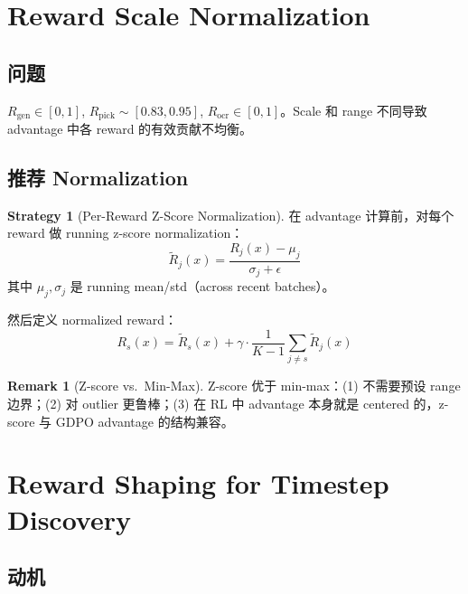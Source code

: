 \documentclass[11pt,a4paper]{article}
\newcommand{\reward}{R}
\theoremstyle{definition}
\newtheorem{remark}{Remark}
\newtheorem{strategy}{Strategy}
\begin{document}
\section{Reward Scale Normalization}
\label{sec:normalization}

\subsection{问题}

$R_{\mathrm{gen}} \in [0, 1]$, $R_{\mathrm{pick}} \sim [0.83, 0.95]$, $R_{\mathrm{ocr}} \in [0, 1]$。Scale 和 range 不同导致 advantage 中各 reward 的有效贡献不均衡。

\subsection{推荐 Normalization}

\begin{strategy}[Per-Reward Z-Score Normalization]
\label{strat:normalize}
在 advantage 计算前，对每个 reward 做 running z-score normalization：
\begin{equation}
\tilde{R}_j(x) = \frac{R_j(x) - \mu_j}{\sigma_j + \epsilon}
\end{equation}
其中 $\mu_j, \sigma_j$ 是 running mean/std（across recent batches）。

然后定义 normalized reward：
\begin{equation}
\reward_s(x) = \tilde{R}_s(x) + \gamma \cdot \frac{1}{K-1}\sum_{j \neq s} \tilde{R}_j(x)
\end{equation}
\end{strategy}

\begin{remark}[Z-score vs.\ Min-Max]
Z-score 优于 min-max：(1) 不需要预设 range 边界；(2) 对 outlier 更鲁棒；(3) 在 RL 中 advantage 本身就是 centered 的，z-score 与 GDPO advantage 的结构兼容。
\end{remark}

\section{Reward Shaping for Timestep Discovery}
\label{sec:shaping}

\subsection{动机}
\end{document}
